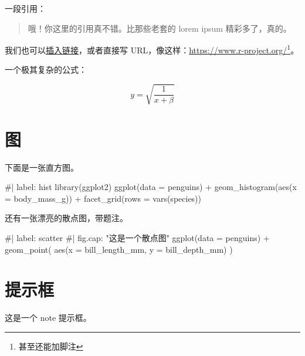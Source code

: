 \documentclass[
  chinese-hans,
  letterpaper,
  DIV=11,
  numbers=noendperiod]{scrreprt}
\newenvironment{Shaded}{\begin{snugshade}}{\end{snugshade}}
\newcommand{\NormalTok}[1]{\textcolor[rgb]{0.00,0.23,0.31}{#1}}
\begin{document}
一段引用：

\begin{quote}
哦！你这里的引用真不错。比那些老套的 lorem ipsum 精彩多了，真的。
\end{quote}

我们也可以\href{https://www.r-project.org/}{插入链接}，或者直接写
URL，像这样：\url{https://www.r-project.org/}\footnote{甚至还能加脚注}。

一个极其复杂的公式：

\[ y = \sqrt{\frac{1}{x + \beta}} \]

\chapter{图}\label{ux56fe}

下面是一张直方图。

\begin{Shaded}
\begin{Highlighting}[]
\NormalTok{\#| label: hist}
\NormalTok{library(ggplot2)}
\NormalTok{ggplot(data = penguins) +}
\NormalTok{    geom\_histogram(aes(x = body\_mass\_g)) +}
\NormalTok{    facet\_grid(rows = vars(species))}
\end{Highlighting}
\end{Shaded}

还有一张漂亮的散点图，带题注。

\begin{Shaded}
\begin{Highlighting}[]
\NormalTok{\#| label: scatter}
\NormalTok{\#| fig.cap: "这是一个散点图"}
\NormalTok{ggplot(data = penguins) +}
\NormalTok{    geom\_point(}
\NormalTok{        aes(x = bill\_length\_mm, y = bill\_depth\_mm)}
\NormalTok{    )}
\end{Highlighting}
\end{Shaded}

\chapter{提示框}\label{ux63d0ux793aux6846}

\begin{tcolorbox}[enhanced jigsaw, arc=.35mm, bottomrule=.15mm, bottomtitle=1mm, breakable, colback=white, colbacktitle=quarto-callout-note-color!10!white, colframe=quarto-callout-note-color-frame, coltitle=black, left=2mm, leftrule=.75mm, opacityback=0, opacitybacktitle=0.6, rightrule=.15mm, title=\textcolor{quarto-callout-note-color}{\faInfo}\hspace{0.5em}{注记}, titlerule=0mm, toprule=.15mm, toptitle=1mm]

这是一个 note 提示框。

\end{tcolorbox}
\end{document}
